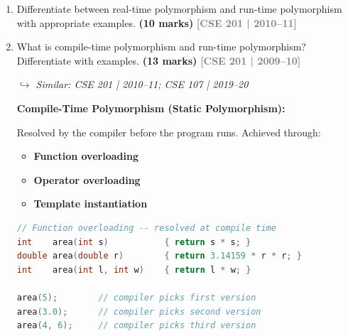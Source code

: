 \documentclass[12pt,a3paper]{article}
\newcommand{\yr}[1]{\hfill\textcolor{gray}{\small\textbf{[#1]}}}
\newcommand{\mk}[1]{\textcolor{orange!70!black}{\small\textbf{(#1 marks)}}}
\newcommand{\variant}[1]{\par\vspace{1pt}\textcolor{blue!50!black}%
  {\footnotesize\textit{$\hookrightarrow$ Similar: #1}}}
\begin{document}
\begin{enumerate}
\begin{tcolorbox}[enhanced,breakable,ansbox,colback=cA!4,colframe=cA,
  boxrule=0.8pt,arc=5pt,
  title={\textbf{Answer}},fonttitle=\bfseries\color{white},colbacktitle=cA]
Most compilers refuse to inline functions that contain
\textbf{loops}, because:
\begin{itemize}[itemsep=2pt]
  \item Inlining a loop body at every call site causes significant
    \emph{code bloat}.
  \item The performance benefit of inlining is minimal when the
    function body itself is non-trivial (the loop iterations dominate
    the cost, not the call overhead).
  \item Many compilers have heuristics that exclude functions with
    loops, recursion, or large bodies from automatic inlining.
\end{itemize}

\end{tcolorbox}

\item Differentiate between real-time polymorphism and run-time polymorphism with appropriate examples. \mk{10}
\yr{CSE 201 | 2010--11}

\item What is compile-time polymorphism and run-time polymorphism? Differentiate with examples. \mk{13}
\yr{CSE 201 | 2009--10}
\variant{CSE 201 | 2010--11; CSE 107 | 2019--20}

\begin{tcolorbox}[enhanced,breakable,ansbox,colback=cA!4,colframe=cA,
  boxrule=0.8pt,arc=5pt,
  title={\textbf{Answer}},fonttitle=\bfseries\color{white},colbacktitle=cA]

\textbf{Compile-Time Polymorphism (Static Polymorphism):}

Resolved by the compiler before the program runs.  Achieved through:
\begin{itemize}[itemsep=1pt]
  \item \textbf{Function overloading}
  \item \textbf{Operator overloading}
  \item \textbf{Template instantiation}
\end{itemize}

\begin{lstlisting}[language=C++]
// Function overloading -- resolved at compile time
int    area(int s)           { return s * s; }
double area(double r)        { return 3.14159 * r * r; }
int    area(int l, int w)    { return l * w; }

area(5);        // compiler picks first version
area(3.0);      // compiler picks second version
area(4, 6);     // compiler picks third version
\end{lstlisting}


\end{tcolorbox}
\end{enumerate}
\end{document}
